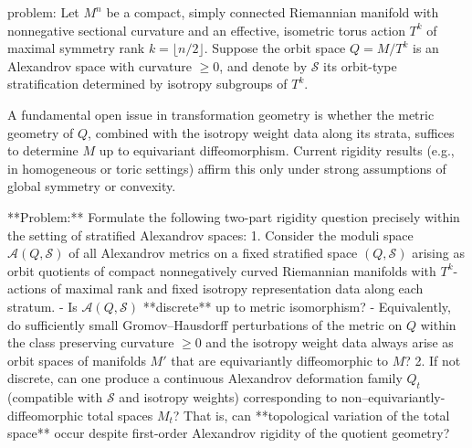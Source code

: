 problem:  
Let \( M^n \) be a compact, simply connected Riemannian manifold with nonnegative sectional curvature and an effective, isometric torus action \( T^k \) of maximal symmetry rank \( k = \lfloor n/2 \rfloor \). Suppose the orbit space \( Q = M/T^k \) is an Alexandrov space with curvature \(\ge 0\), and denote by \( \mathcal{S} \) its orbit-type stratification determined by isotropy subgroups of \(T^k\).  

A fundamental open issue in transformation geometry is whether the metric geometry of \(Q\), combined with the isotropy weight data along its strata, suffices to determine \(M\) up to equivariant diffeomorphism. Current rigidity results (e.g., in homogeneous or toric settings) affirm this only under strong assumptions of global symmetry or convexity.  

**Problem:**  
Formulate the following two-part rigidity question precisely within the setting of stratified Alexandrov spaces:  
1. Consider the moduli space \(\mathcal{A}(Q, \mathcal{S})\) of all Alexandrov metrics on a fixed stratified space \((Q,\mathcal{S})\) arising as orbit quotients of compact nonnegatively curved Riemannian manifolds with \(T^k\)-actions of maximal rank and fixed isotropy representation data along each stratum.  
   - Is \(\mathcal{A}(Q, \mathcal{S})\) **discrete** up to metric isomorphism?  
   - Equivalently, do sufficiently small Gromov–Hausdorff perturbations of the metric on \(Q\) within the class preserving curvature \(\ge 0\) and the isotropy weight data always arise as orbit spaces of manifolds \(M'\) that are equivariantly diffeomorphic to \(M\)?  
2. If not discrete, can one produce a continuous Alexandrov deformation family \(Q_t\) (compatible with \(\mathcal{S}\) and isotropy weights) corresponding to non–equivariantly-diffeomorphic total spaces \(M_t\)? That is, can **topological variation of the total space** occur despite first-order Alexandrov rigidity of the quotient geometry?  

